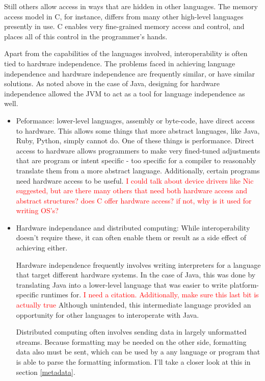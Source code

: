 \documentclass{sig-alternate}
\newcommand{\mycomment}[1]{\textcolor{red}{#1}}
\begin{document}
Still others allow access in ways that are hidden in other languages. The memory access model in C, for instance, differs from many other high-level languages presently in use. C enables very fine-grained memory access and control, and places all of this control in the programmer's hands.


Apart from the capabilities of the languages involved, interoperability is often tied to hardware independence. The problems faced in achieving language independence and hardware independence are frequently similar, or have similar solutions. As noted above in the case of Java, designing for hardware independence allowed the JVM to act as a tool for language independence as well.

\begin{itemize}

	
	\item Peformance: lower-level languages, assembly or byte-code, have direct access to hardware. This allows some things that more abstract languages, like Java, Ruby, Python, simply cannot do. One of these things is performance. Direct access to hardware allows programmers to make very fined-tuned adjustments that are program or intent specific - too specific for a compiler to reasonably translate them from a more abstract language. 
	Additionally, certain programs need hardware access to be useful. \mycomment{I could talk about device drivers like Nic suggested, but are there many others that need both hardware access and abstract structures?}
	\mycomment{does C offer hardware access? if not, why is it used for writing OS's?}
		
	\item Hardware independance and distributed computing: While interoperability doesn't require these, it can often enable them or result as a side effect of achieving either.
	
	Hardware independence frequently involves writing interpreters for a language that target different hardware systems. In the case of Java, this was done by translating Java into a lower-level language that was easier to write platform-specific runtimes for.
	\mycomment{I need a citation. Additionally, make sure this last bit is actually true}
	Although unintended, this intermediate language provided an opportunity for other languages to interoperate with Java.	
	
	Distributed computing often involves sending data in largely unformatted streams. Because formatting may be needed on the other side, formatting data also must be sent, which can be used by a any language or program that is able to parse the formatting information. I'll take a closer look at this in section \ref{metadata}.
\end{itemize}
\end{document}
